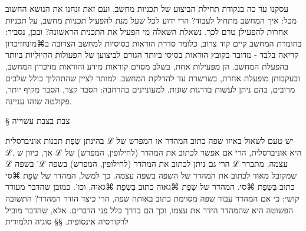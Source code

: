 עסקנו עד כה בנקודת תחילת הביצוע של תכניות מחשב, ועם זאת זנחנו את הנושא החשוב מכל: איך המחשב מתחיל לעבוד? הרי ידוע לכל שעל מנת להפעיל תכניות מחשב, על תכניות אחרות להפעילן טרם לכך. נשאלת השאלה מי הפעיל את התכנית הראשונה? ובכן, נסביר: בחומרת המחשב קיים קוד צרוב, כלומר סדרת הוראות בסיסיות למחשב הצרובה ב⌘מונח{זיכרון קריאה בלבד} - מדובר בקובץ הוראות בסיסי ביותר הגורם לביצוען של הפעולות ההִיוּלִיוֹת ביותר בהפעלת המחשב. הן מפעילות אחת, בשלב מסוים קוראות מידע והוראות מזיכרון המחשב, ובעקבותן מופעלת אחרת, בשרשרת עד להדלקת המחשב. למותר לציין שהתהליך כולל שלבים מרובים, בהם ניתן לעשות בדרגות שונות. למעוניינים בהרחבה: הסבר קצר, הסבר מקיף יותר, פקולטה שזהו עניינה.



§ צבת בצבת עשוייה

בהינתן שְׂפַת תכנות אוניברסלית ℒ יש טעם לשאול באיזו שפה כתוב המהדר או המפרש של ℒ. אך, כיוון ש ℒ היא אוניברסלית, הרי אם אפשר לכתוב את המהדר (לחילופין, המפרש) של ℒ בשפה 'ℒ הרי גם ניתן לכתוב את המהדר (לחילופין, המפרש) בשפה ℒ עצמה. 
מתברר שמקובל מאוד לכתוב את המהדר של השפה בשפה עצמה. כך למשל, המהדר של שְׂפַת ⌘סי כתוב בִּשְׂפַת ⌘סי. המהדר של שְׂפַת ⌘גאוה כתוב בִּשְׂפַת ⌘גאוה, וכו'. כמובן שהדבר מעורר קושי: כי אם המהדר עבור שפה מסוימת כתוב באותה שפה, הרי כיצד הודר המהדר? התשובה הפשוטה היא שהמהדר הידר את עצמו, וכך הם בדרך כלל פני הדברים. אלא, שהדבר מוביל לרקורסיה אינסופית.
​§§ סוגיה תלמודית

